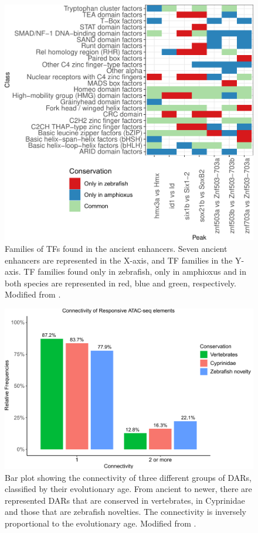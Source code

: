 \begin{figure}[hp]
\centering
\includegraphics[width=1\textwidth]{Figures/Ultraconserved_TFBS_families}
\caption[Ultraconserved TFBS families]{Families of TFs found in the ancient enhancers. Seven ancient enhancers are represented in the X-axis, and TF families in the Y-axis. TF families found only in zebrafish, only in amphioxus and in both species are represented in red, blue and green, respectively. Modified from \parencite{gil-galvez_gain_2022}.}
\label{fig:Ultraconserved_TFBS_families}
\end{figure} 


\begin{figure}[h]
\centering
\includegraphics[width=1\textwidth]{Figures/DARs_connect_evolutionary_age}
\caption[Newer DARs show more connectivity than older ones]{Bar plot showing the connectivity of three different groups of DARs, classified by their evolutionary age. From ancient to newer, there are represented DARs that are conserved in vertebrates, in Cyprinidae and those that are zebrafish novelties. The connectivity is inversely proportional to the evolutionary age. Modified from \parencite{gil-galvez_gain_2022}.}
\label{fig:DARs_connect_evolutionary_age}
\end{figure} 

